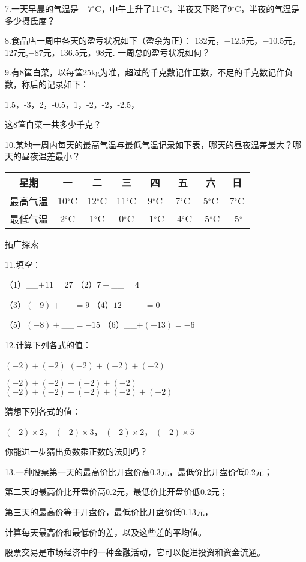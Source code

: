 \documentclass{article}
\begin{document}
\begin{exercise}
7.一天早晨的气温是 ${-7}^\circ$C，中午上升了11$^\circ$C，半夜又下降了9$^\circ$C，半夜的气温是多少摄氏度？

8.食品店一周中各天的盈亏状况如下（盈余为正）：
	132元，${-12.5}$元，${-10.5}$元，127元,${-87}$元，136.5元，98元.
一周总的盈亏状况如何？

9.有8筐白菜，以每筐25kg为准，超过的千克数记作正数，不足的千克数记作负数，称后的记录如下：

1.5，-3，2，-0.5，1，-2，-2，-2.5，

这8筐白菜一共多少千克？

10.某地一周内每天的最高气温与最低气温记录如下表，哪天的昼夜温差最大？哪天的昼夜温差最小？

\begin{tabular}{|c|c|c|c|c|c|c|c|}
     \hline
     星期&一&二&三&四&五&六&日\\
     \hline
     最高气温&10$^\circ$C&12$^\circ$C&11$^\circ$C&9$^\circ$C&7$^\circ$C&5$^\circ$C&7$^\circ$C\\
     \hline
     最低气温&2$^\circ$C&1$^\circ$C&0$^\circ$C&-1$^\circ$C&-4$^\circ$C&-5$^\circ$C&-5$^\circ$\\
     \hline
\end{tabular}

拓广探索

11.填空：

    （1）__$+11=27$          （2）$7+$__$=4$

    （3）$(-9)+$__$=9$       （4）$12+$__$=0$
    
    （5）$(-8)+$__$=-15$     （6）__$+(-13)=-6$
    
12.计算下列各式的值：

    $(-2)+(-2)$                 $(-2)+(-2)+(-2)$
    
    $(-2)+(-2)+(-2)+(-2)$       $(-2)+(-2)+(-2)+(-2)+(-2)$
    
猜想下列各式的值：

    ${(-2)}\times 2$， ${(-2)}\times 3$， ${(-2)}\times 2$， ${(-2)}\times 5$
    
你能进一步猜出负数乘正数的法则吗？

13.一种股票第一天的最高价比开盘价高0.3元，最低价比开盘价低0.2元；

第二天的最高价比开盘价高0.2元，最低价比开盘价低0.2元；

第三天的最高价等于开盘价，最低价比开盘价低0.13元，

计算每天最高价和最低价的差，以及这些差的平均值。

股票交易是市场经济中的一种金融活动，它可以促进投资和资金流通。
\end{exercise}
\end{document}
